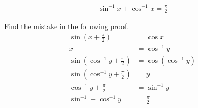 \begin{pr}
 \begin{align*}
 \sin^{-1} x + \cos^{-1} x = \frac \pi 2 
 \end{align*}
\end{pr}
\begin{ex} Find the mistake in the following proof.
 \begin{align*}
 \sin \left(x + \frac \pi 2 \right) & = \cos x \\
 x & = \cos ^{-1} y \\
 \sin \left( \cos^{-1} y + \frac \pi 2 \right) & = \cos \left( \cos^{-1} y \right) \\
 \sin \left( \cos^{-1} y + \frac \pi 2 \right) & = y \\
 \cos^{-1} y + \frac \pi 2 & = \sin^{-1} y \\
 \sin^{-1}-\cos^{-1} y & = \frac \pi 2
 \end{align*}
\end{ex} 
 
 
 
 
 
 
 
 
 